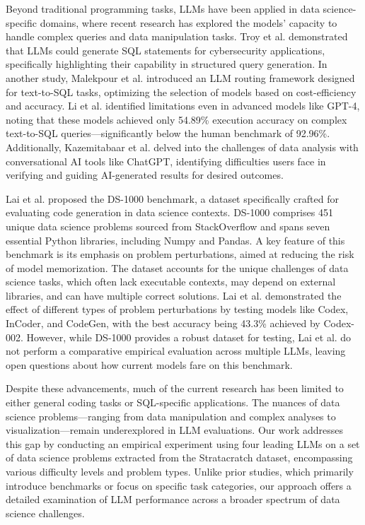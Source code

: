 \documentclass[conference]{IEEEtran}
\begin{document}
Beyond traditional programming tasks, LLMs have been applied in data science-specific domains, where recent research has explored the models' capacity to handle complex queries and data manipulation tasks. Troy et al. \cite{troy2023enabling} demonstrated that LLMs could generate SQL statements for cybersecurity applications, specifically highlighting their capability in structured query generation. In another study, Malekpour et al. \cite{malekpour2024towards} introduced an LLM routing framework designed for text-to-SQL tasks, optimizing the selection of models based on cost-efficiency and accuracy. Li et al. \cite{li2024can} identified limitations even in advanced models like GPT-4, noting that these models achieved only 54.89\% execution accuracy on complex text-to-SQL queries—significantly below the human benchmark of 92.96\%. Additionally, Kazemitabaar et al. \cite{kazemitabaar2024improving} delved into the challenges of data analysis with conversational AI tools like ChatGPT, identifying difficulties users face in verifying and guiding AI-generated results for desired outcomes.


Lai et al. \cite{lai2023ds} proposed the DS-1000 benchmark, a dataset specifically crafted for evaluating code generation in data science contexts. DS-1000 comprises 451 unique data science problems sourced from StackOverflow and spans seven essential Python libraries, including Numpy and Pandas. A key feature of this benchmark is its emphasis on problem perturbations, aimed at reducing the risk of model memorization. The dataset accounts for the unique challenges of data science tasks, which often lack executable contexts, may depend on external libraries, and can have multiple correct solutions. Lai et al. demonstrated the effect of different types of problem perturbations by testing models like Codex, InCoder, and CodeGen, with the best accuracy being 43.3\% achieved by Codex-002. However, while DS-1000 provides a robust dataset for testing, Lai et al. do not perform a comparative empirical evaluation across multiple LLMs, leaving open questions about how current models fare on this benchmark.


Despite these advancements, much of the current research has been limited to either general coding tasks or SQL-specific applications. The nuances of data science problems—ranging from data manipulation and complex analyses to visualization—remain underexplored in LLM evaluations. Our work addresses this gap by conducting an empirical experiment using four leading LLMs on a set of data science problems extracted from the Stratacratch dataset, encompassing various difficulty levels and problem types. Unlike prior studies, which primarily introduce benchmarks or focus on specific task categories, our approach offers a detailed examination of LLM performance across a broader spectrum of data science challenges. 
\end{document}
